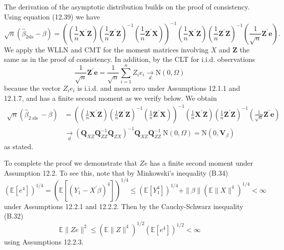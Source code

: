 \documentclass[10pt]{article}
\begin{document}
The derivation of the asymptotic distribution builds on the proof of consistency. Using equation (12.39) we have
$$
\sqrt{n}\left(\widehat{\beta}_{2 \mathrm{sls}}-\beta\right)=\left(\left(\frac{1}{n} \boldsymbol{X}^{\prime} \boldsymbol{Z}\right)\left(\frac{1}{n} \boldsymbol{Z}^{\prime} \boldsymbol{Z}\right)^{-1}\left(\frac{1}{n} \boldsymbol{Z}^{\prime} \boldsymbol{X}\right)\right)^{-1}\left(\frac{1}{n} \boldsymbol{X}^{\prime} \boldsymbol{Z}\right)\left(\frac{1}{n} \boldsymbol{Z}^{\prime} \boldsymbol{Z}\right)^{-1}\left(\frac{1}{\sqrt{n}} \boldsymbol{Z}^{\prime} \boldsymbol{e}\right) \text {. }
$$
We apply the WLLN and CMT for the moment matrices involving $X$ and $\boldsymbol{Z}$ the same as in the proof of consistency. In addition, by the CLT for i.i.d. observations
$$
\frac{1}{\sqrt{n}} \boldsymbol{Z}^{\prime} \boldsymbol{e}=\frac{1}{\sqrt{n}} \sum_{i=1}^{n} Z_{i} e_{i} \underset{d}{\longrightarrow} \mathrm{N}(0, \Omega)
$$
because the vector $Z_{i} e_{i}$ is i.i.d. and mean zero under Assumptions 12.1.1 and 12.1.7, and has a finite second moment as we verify below. We obtain
$$
\begin{aligned}
\sqrt{n}\left(\widehat{\beta}_{2 \text { sls }}-\beta\right) &=\left(\left(\frac{1}{n} \boldsymbol{X}^{\prime} \boldsymbol{Z}\right)\left(\frac{1}{n} \boldsymbol{Z}^{\prime} \boldsymbol{Z}\right)^{-1}\left(\frac{1}{n} \boldsymbol{Z}^{\prime} \boldsymbol{X}\right)\right)^{-1}\left(\frac{1}{n} \boldsymbol{X}^{\prime} \boldsymbol{Z}\right)\left(\frac{1}{n} \boldsymbol{Z}^{\prime} \boldsymbol{Z}\right)^{-1}\left(\frac{1}{\sqrt{n}} \boldsymbol{Z}^{\prime} \boldsymbol{e}\right) \\
& \underset{d}{\rightarrow}\left(\boldsymbol{Q}_{X Z} \boldsymbol{Q}_{Z Z}^{-1} \boldsymbol{Q}_{Z X}\right)^{-1} \boldsymbol{Q}_{X Z} \boldsymbol{Q}_{Z Z}^{-1} \mathrm{~N}(0, \Omega)=\mathrm{N}\left(0, \boldsymbol{V}_{\beta}\right)
\end{aligned}
$$
as stated.

To complete the proof we demonstrate that $Z e$ has a finite second moment under Assumption 12.2. To see this, note that by Minkowski's inequality (B.34)
$$
\left(\mathbb{E}\left[e^{4}\right]\right)^{1 / 4}=\left(\mathbb{E}\left[\left(Y_{1}-X^{\prime} \beta\right)^{4}\right]\right)^{1 / 4} \leq\left(\mathbb{E}\left[Y_{1}^{4}\right]\right)^{1 / 4}+\|\beta\|\left(\mathbb{E}\|X\|^{4}\right)^{1 / 4}<\infty
$$
under Assumptions 12.2.1 and 12.2.2. Then by the Cauchy-Schwarz inequality (B.32)
$$
\mathbb{E}\|Z e\|^{2} \leq\left(\mathbb{E}\|Z\|^{4}\right)^{1 / 2}\left(\mathbb{E}\left[e^{4}\right]\right)^{1 / 2}<\infty
$$
using Assumptions 12.2.3.
\end{document}
